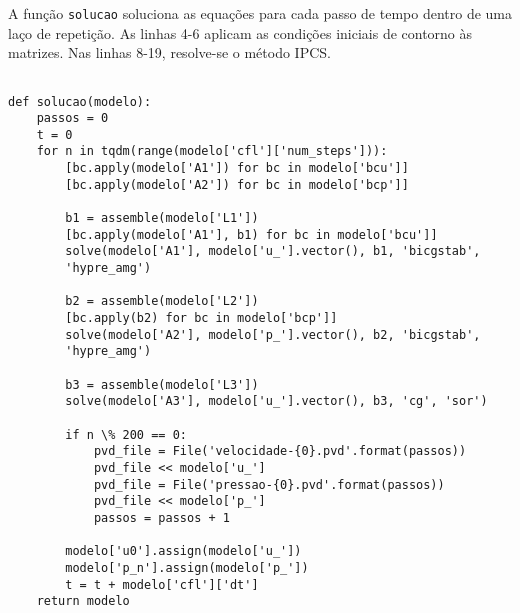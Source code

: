 A função \texttt{solucao} soluciona as equações para cada passo de tempo dentro de uma laço de repetição. As linhas 4-6 aplicam as condições iniciais de contorno às matrizes. Nas linhas 8-19, resolve-se o método IPCS.

\begin{lstlisting}[title=\phantom{}]

def solucao(modelo):
    passos = 0
    t = 0
    for n in tqdm(range(modelo['cfl']['num_steps'])):
        [bc.apply(modelo['A1']) for bc in modelo['bcu']]
        [bc.apply(modelo['A2']) for bc in modelo['bcp']]
        
        b1 = assemble(modelo['L1'])
        [bc.apply(modelo['A1'], b1) for bc in modelo['bcu']]
        solve(modelo['A1'], modelo['u_'].vector(), b1, 'bicgstab',
        'hypre_amg')
        
        b2 = assemble(modelo['L2'])
        [bc.apply(b2) for bc in modelo['bcp']]
        solve(modelo['A2'], modelo['p_'].vector(), b2, 'bicgstab',
        'hypre_amg')
        
        b3 = assemble(modelo['L3'])
        solve(modelo['A3'], modelo['u_'].vector(), b3, 'cg', 'sor')
        
        if n \% 200 == 0:
            pvd_file = File('velocidade-{0}.pvd'.format(passos))
            pvd_file << modelo['u_']
            pvd_file = File('pressao-{0}.pvd'.format(passos))
            pvd_file << modelo['p_']
            passos = passos + 1
        
        modelo['u0'].assign(modelo['u_'])
        modelo['p_n'].assign(modelo['p_'])
        t = t + modelo['cfl']['dt']
    return modelo
\end{lstlisting}